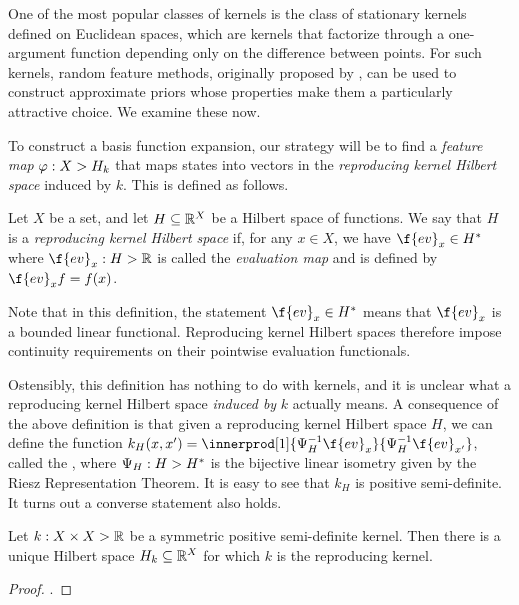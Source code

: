 \documentclass[11pt]{book}
\begin{document}
One of the most popular classes of kernels is the class of stationary kernels defined on Euclidean spaces, which are kernels that factorize through a one-argument function depending only on the difference between points.
For such kernels, random feature methods, originally proposed by \textcite{rahimi08}, can be used to construct approximate priors whose properties make them a particularly attractive choice.
We examine these now.

To construct a basis function expansion, our strategy will be to find a \emph{feature map} $\varphi : X \-> H_k$ that maps states into vectors in the \emph{reproducing kernel Hilbert space} induced by $k$.
This is defined as follows.

\begin{definition}
Let $X$ be a set, and let $H \subseteq \mathbb{R}^X$ be a Hilbert space of functions. 
We say that $H$ is a \emph{reproducing kernel Hilbert space} if, for any $x\in X$, we have $\f{ev}_x \in H^*$ where $\f{ev}_x : H \-> \R$ is called the \emph{evaluation map} and is defined by $\f{ev}_x f = f(x)$.
\end{definition}

Note that in this definition, the statement $\f{ev}_x \in H^*$ means that $\f{ev}_x$ is a bounded linear functional.
Reproducing kernel Hilbert spaces therefore impose continuity requirements on their pointwise evaluation functionals.

Ostensibly, this definition has nothing to do with kernels, and it is unclear what a reproducing kernel Hilbert space \emph{induced by} $k$ actually means.
A consequence of the above definition is that given a reproducing kernel Hilbert space $H$, we can define the function $k_{H}(x,x') = \innerprod[1]{\Psi_{H}^{-1}\f{ev}_x}{\Psi^{-1}_{H}\f{ev}_{x'}}$, called the , where $\Psi_{H} : H \-> H^*$ is the bijective linear isometry given by the Riesz Representation Theorem.
It is easy to see that $k_{H}$ is positive semi-definite.
It turns out a converse statement also holds.

\begin{result}
Let $k : X \times X \-> \mathbb{R}$ be a symmetric positive semi-definite kernel.
Then there is a unique Hilbert space $H_k \subseteq \mathbb{R}^X$ for which $k$ is the reproducing kernel.
\end{result}

\begin{proof}
\textcite[Proposition 2.13 and Theorem 2.14]{paulsen16}.
\end{proof}
\end{document}
